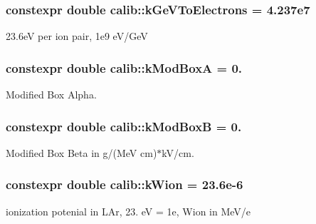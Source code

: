 \hypertarget{namespacecalib_ae60a5755f9f465d0287d277650040d34}{
\subsubsection[{k\-Ge\-V\-To\-Electrons}]{\setlength{\rightskip}{0pt plus 5cm}constexpr double calib\-::k\-Ge\-V\-To\-Electrons = 4.\-237e7}}\label{namespacecalib_ae60a5755f9f465d0287d277650040d34}


23.\-6e\-V per ion pair, 1e9 e\-V/\-Ge\-V 

\hypertarget{namespacecalib_a16e735162e8ea0d3353c964b4a262820}{
\subsubsection[{k\-Mod\-Box\-A}]{\setlength{\rightskip}{0pt plus 5cm}constexpr double calib\-::k\-Mod\-Box\-A = 0.}}\label{namespacecalib_a16e735162e8ea0d3353c964b4a262820}


Modified Box Alpha. 

\hypertarget{namespacecalib_a72195815709970d1ebc8c4e1f3f9ee69}{
\subsubsection[{k\-Mod\-Box\-B}]{\setlength{\rightskip}{0pt plus 5cm}constexpr double calib\-::k\-Mod\-Box\-B = 0.}}\label{namespacecalib_a72195815709970d1ebc8c4e1f3f9ee69}


Modified Box Beta in g/(Me\-V cm)$\ast$k\-V/cm. 

\hypertarget{namespacecalib_aba19df99e169a2fe2382757e26216f88}{
\subsubsection[{k\-Wion}]{\setlength{\rightskip}{0pt plus 5cm}constexpr double calib\-::k\-Wion = 23.\-6e-\/6}}\label{namespacecalib_aba19df99e169a2fe2382757e26216f88}


ionization potenial in L\-Ar, 23. e\-V = 1e, Wion in Me\-V/e 

